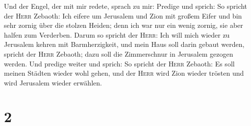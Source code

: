 Und der Engel, der mit mir redete, sprach zu mir: Predige und sprich: So
spricht der \textsc{Herr} Zebaoth: Ich eifere um Jerusalem und Zion mit
großem Eifer  und bin sehr zornig über die stolzen
Heiden; denn ich war nur ein wenig zornig, sie aber halfen zum
Verderben.  Darum so spricht der \textsc{Herr}: Ich will
mich wieder zu Jerusalem kehren mit Barmherzigkeit, und mein Haus soll
darin gebaut werden, spricht der \textsc{Herr} Zebaoth; dazu soll die
Zimmerschnur in Jerusalem gezogen werden.  Und predige
weiter und sprich: So spricht der \textsc{Herr} Zebaoth: Es soll meinen
Städten wieder wohl gehen, und der \textsc{Herr} wird Zion wieder
trösten und wird Jerusalem wieder erwählen.

\hypertarget{section-1}{%
\section{2}\label{section-1}}

